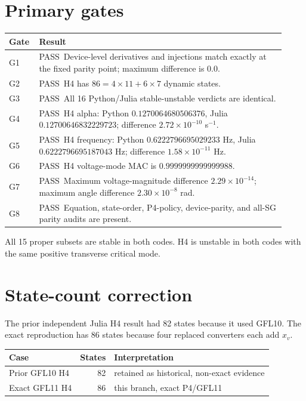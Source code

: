 \documentclass[10pt]{article}
\newcommand{\pass}{\textcolor{green!45!black}{PASS}}
\begin{document}
\section*{Primary gates}
\begin{center}
\small
\begin{tabular}{p{0.08\linewidth}p{0.84\linewidth}}
\toprule
Gate & Result \\
\midrule
G1 & \pass\ Device-level derivatives and injections match exactly at the fixed parity point; maximum difference is $0.0$. \\
G2 & \pass\ H4 has $86=4\times11+6\times7$ dynamic states. \\
G3 & \pass\ All 16 Python/Julia stable-unstable verdicts are identical. \\
G4 & \pass\ H4 alpha: Python $0.1270064680506376$, Julia $0.12700646832229723$; difference $2.72\times10^{-10}$ s$^{-1}$. \\
G5 & \pass\ H4 frequency: Python $0.6222796695029233$ Hz, Julia $0.6222796695187043$ Hz; difference $1.58\times10^{-11}$ Hz. \\
G6 & \pass\ H4 voltage-mode MAC is $0.9999999999999988$. \\
G7 & \pass\ Maximum voltage-magnitude difference $2.29\times10^{-14}$; maximum angle difference $2.30\times10^{-8}$ rad. \\
G8 & \pass\ Equation, state-order, P4-policy, device-parity, and all-SG parity audits are present. \\
\bottomrule
\end{tabular}
\end{center}

All 15 proper subsets are stable in both codes. H4 is unstable in both codes with the same positive transverse critical mode.

\section*{State-count correction}

The prior independent Julia H4 result had 82 states because it used GFL10. The exact reproduction has 86 states because four replaced converters each add $x_v$.

\begin{center}
\begin{tabular}{lrl}
\toprule
Case & States & Interpretation \\
\midrule
Prior GFL10 H4 & 82 & retained as historical, non-exact evidence \\
Exact GFL11 H4 & 86 & this branch, exact P4/GFL11 \\
\bottomrule
\end{tabular}
\end{center}
\end{document}
